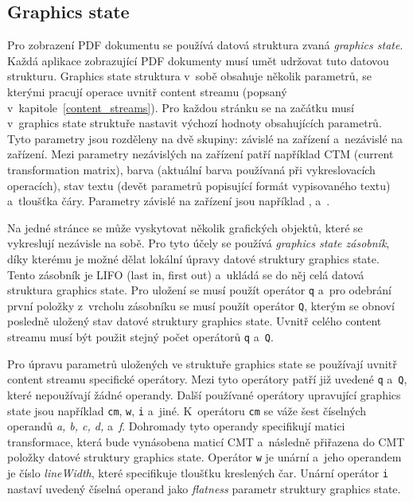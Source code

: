 \subsection*{Graphics state}
Pro zobrazení PDF dokumentu se používá datová struktura zvaná \emph{graphics state}.
Každá aplikace zobrazující PDF dokumenty musí umět udržovat tuto datovou strukturu.
Graphics state struktura v~sobě obsahuje několik parametrů, se kterými pracují
operace uvnitř content streamu (popsaný v~kapitole~\ref{content_streams}). Pro
každou stránku se na začátku musí v~graphics state struktuře nastavit výchozí
hodnoty obsahujících parametrů. Tyto parametry jsou rozděleny na dvě skupiny:
závislé na zařízení a~nezávislé na zařízení. Mezi parametry nezávislých na zařízení
patří například CTM (current transformation matrix), barva (aktuální barva
používaná při vykreslovacích operacích), stav textu (devět parametrů popisující
formát vypisovaného textu) a~tloušťka čáry. Parametry závislé na zařízení jsou
například ,  a~.

Na jedné stránce se může vyskytovat několik grafických objektů, které se
vykreslují nezávisle na sobě. Pro tyto účely se používá
\emph{graphics state zásobník}, díky kterému je možné dělat lokální úpravy 
datové struktury graphics state. Tento zásobník je LIFO (last in, first out)
a~ukládá se do něj celá datová struktura graphics state. Pro uložení
se musí použít operátor \texttt{q} a~pro odebrání první položky z~vrcholu
zásobníku se musí použít operátor \texttt{Q}, kterým se obnoví posledně uložený
stav datové struktury graphics state. Uvnitř celého content streamu musí být
použit stejný počet operátorů \texttt{q} a~\texttt{Q}.

Pro úpravu parametrů uložených ve struktuře graphics state se používají uvnitř
content streamu specifické operátory. Mezi tyto operátory patří již uvedené
\texttt{q} a~\texttt{Q}, které nepoužívají žádné operandy. Další používané
operátory upravující graphics state jsou například \texttt{cm}, \texttt{w},
\texttt{i} a~jiné. K~operátoru \texttt{cm} se váže šest číselných operandů
\emph{a, b, c, d,} a~\emph{f}. Dohromady tyto operandy specifikují matici
transformace, která bude vynásobena maticí CMT a~následně přiřazena do CMT položky
datové struktury graphics state. Operátor \texttt{w} je unární a~jeho operandem
je číslo \emph{lineWidth}, které specifikuje tloušťku kreslených čar. Unární
operátor \texttt{i} nastaví uvedený číselná operand jako \emph{flatness} parametr
struktury graphics state.




